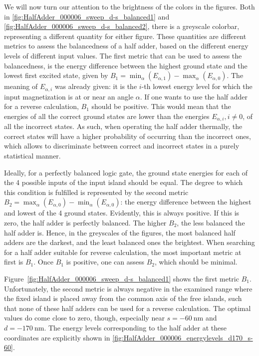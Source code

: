 \documentclass[11pt,a4paper,english]{article}
\begin{document}
We will now turn our attention to the brightness of the colors in the figures. Both in \cref{fig:HalfAdder_000006_sweep_d-s_balanced1} and \cref{fig:HalfAdder_000006_sweep_d-s_balanced2}, there is a greyscale colorbar, representing a different quantity for either figure. These quantities are different metrics to assess the balancedness of a half adder, based on the different energy levels of different input values. The first metric that can be used to assess the balancedness, is the energy difference between the highest ground state and the lowest first excited state, given by $B_1 = \min_\alpha(E_{\alpha,1}) - \max_\alpha(E_{\alpha,0})$. The meaning of $E_{\alpha,i}$ was already given: it is the $i$-th lowest energy level for which the input magnetization is at or near an angle $\alpha$. If one wants to use the half adder for a reverse calculation, $B_1$ should be positive. This would mean that the energies of all the correct ground states are lower than the energies $E_{\alpha,i}, i\neq 0$, of all the incorrect states. As such, when operating the half adder thermally, the correct states will have a higher probability of occurring than the incorrect ones, which allows to discriminate between correct and incorrect states in a purely statistical manner. \par
Ideally, for a perfectly balanced logic gate, the ground state energies for each of the 4 possible inputs of the input island should be equal. The degree to which this condition is fulfilled is represented by the second metric $B_2 = \max_\alpha(E_{\alpha,0}) - \min_\alpha(E_{\alpha,0})$: the energy difference between the highest and lowest of the 4 ground states. Evidently, this is always positive. If this is zero, the half adder is perfectly balanced. The higher $B_2$, the less balanced the half adder is.
Hence, in the greyscales of the figures, the most balanced half adders are the darkest, and the least balanced ones the brightest. When searching for a half adder suitable for reverse calculation, the most important metric at first is $B_1$. Once $B_1$ is positive, one can assess $B_2$, which should be minimal. \par
Figure~\ref{fig:HalfAdder_000006_sweep_d-s_balanced1} shows the first metric $B_1$. Unfortunately, the second metric is always negative in the examined range where the fixed island is placed away from the common axis of the free islands, such that none of these half adders can be used for a reverse calculation. The optimal values do come close to zero, though, especially near $s=\SI{-60}{\nano\metre}$ and $d=\SI{-170}{\nano\metre}$. The energy levels corresponding to the half adder at these coordinates are explicitly shown in \cref{fig:HalfAdder_000006_energylevels_d170_s-60}.
\end{document}
